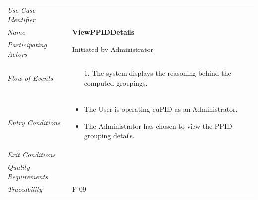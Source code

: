 \documentclass[12pt,letterpaper]{article}
\begin{document}
\begin{center}
	\begin{tabu} to 
		\toprule
		Use Case Identifier & \viewppiddetails{} \\
		Name & {\bf ViewPPIDDetails} \\
		Participating Actors & Initiated by Administrator \\
		Flow of Events & 
		\begin{minipage}[t]{\linewidth}
		    \begin{enumerate}
		        \item[1.] The system displays the reasoning behind the computed groupings.
			\end{enumerate}
	    \end{minipage} \\

		Entry Conditions &
		\begin{minipage}[t]{\linewidth}
			\begin{itemize}
			    \item The User is operating cuPID as an Administrator.
			    \item The Administrator has chosen to view the PPID grouping details.
	        \end{itemize}
	    \end{minipage} \\

		Exit Conditions & \\

		Quality Requirements & \\

		Traceability & F-09 \\
		\toprule
	\end{tabu}
\end{center}
\end{document}

